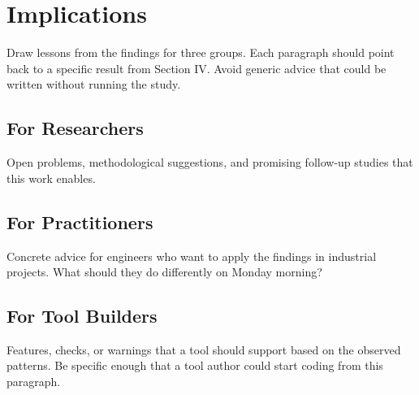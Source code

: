 \section{Implications}
Draw lessons from the findings for three groups. Each paragraph should
point back to a specific result from Section IV. Avoid generic advice
that could be written without running the study.
 
\subsection{For Researchers}
Open problems, methodological suggestions, and promising follow-up
studies that this work enables.
 
\subsection{For Practitioners}
Concrete advice for engineers who want to apply the findings in
industrial projects. What should they do differently on Monday morning?
 
\subsection{For Tool Builders}
Features, checks, or warnings that a tool should support based on the
observed patterns. Be specific enough that a tool author could start
coding from this paragraph.
 

\clearpage
 


